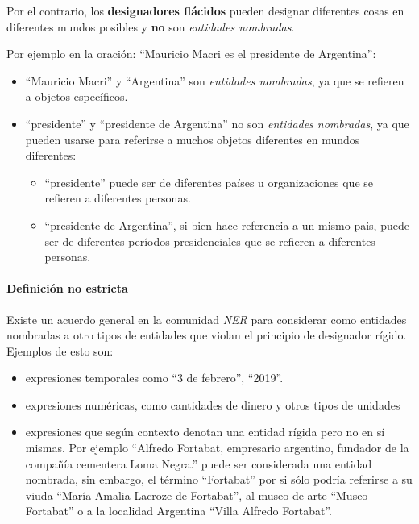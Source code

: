 \documentclass[12pt,a4paper,]{scrartcl}
\providecommand{\tightlist}{%
  \setlength{\itemsep}{0pt}\setlength{\parskip}{0pt}}
\let\oldparagraph\paragraph
\renewcommand{\paragraph}[1]{\oldparagraph{#1}\mbox{}}
\begin{document}
Por el contrario, los \textbf{designadores flácidos} pueden designar diferentes cosas en diferentes mundos posibles y \textbf{no} son \emph{entidades nombradas}.

Por ejemplo en la oración: \enquote{Mauricio Macri es el presidente de Argentina}:

\begin{itemize}
\tightlist
\item
  \enquote{Mauricio Macri} y \enquote{Argentina} son \emph{entidades nombradas}, ya que se refieren a objetos específicos.
\item
  \enquote{presidente} y \enquote{presidente de Argentina} no son \emph{entidades nombradas}, ya que pueden usarse para referirse a muchos objetos diferentes en mundos diferentes:

  \begin{itemize}
  \tightlist
  \item
    \enquote{presidente} puede ser de diferentes países u organizaciones que se refieren a diferentes personas.
  \item
    \enquote{presidente de Argentina}, si bien hace referencia a un mismo pais, puede ser de diferentes períodos presidenciales que se refieren a diferentes personas.
  \end{itemize}
\end{itemize}

\hypertarget{definiciuxf3n-no-estricta}{%
\paragraph{Definición no estricta}\label{definiciuxf3n-no-estricta}}

Existe un acuerdo general en la comunidad \emph{NER} para considerar como entidades nombradas a otro tipos de entidades que violan el principio de designador rígido. Ejemplos de esto son:

\begin{itemize}
\tightlist
\item
  expresiones temporales como \enquote{3 de febrero}, \enquote{2019}.
\item
  expresiones numéricas, como cantidades de dinero y otros tipos de unidades
\item
  expresiones que según contexto denotan una entidad rígida pero no en sí mismas. Por ejemplo \enquote{Alfredo Fortabat, empresario argentino, fundador de la compañía cementera Loma Negra.} puede ser considerada una entidad nombrada, sin embargo, el término \enquote{Fortabat} por si sólo podría referirse a su viuda \enquote{María Amalia Lacroze de Fortabat}, al museo de arte \enquote{Museo Fortabat} o a la localidad Argentina \enquote{Villa Alfredo Fortabat}.
\end{itemize}
\end{document}
